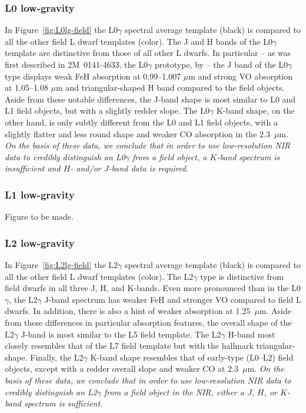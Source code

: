 \documentclass[12pt,preprint]{aastex}
\begin{document}
\subsubsection{L0 low-gravity}
In Figure~\ref{fig:L0lg-field} the L0$\gamma$ spectral average template (black) is compared to all the other field L dwarf templates (color).  The J and H bands of the L0$\gamma$ template are distinctive from those of all other L dwarfs. In particular -- as was first described in 2M~0141-4633, the L0$\gamma$ prototype, by \cite{Kirkpatrick06} -- the J band of the L0$\gamma$ type displays weak FeH absorption at 0.99--1.007 $\mu$m and strong VO absorption at 1.05--1.08 $\mu$m and triangular-shaped H band compared to the field objects. Aside from these notable differences, the J-band shape is most similar to L0 and L1 field objects, but with a slightly redder slope. The L0$\gamma$ K-band shape, on the other hand, is only subtly different from the L0 and L1 field objects, with a slightly flatter and less round shape and weaker CO absorption in the 2.3~$\mu$m. 
\emph{On the basis of these data, we conclude that in order to use low-resolution NIR data to credibly distinguish an L0$\gamma$ from a field object, a $K$-band spectrum is insufficient and $H$- and/or $J$-band data is required.}

\subsubsection{L1 low-gravity}
Figure to be made.

\subsubsection{L2 low-gravity}
In Figure~\ref{fig:L2lg-field} the L2$\gamma$ spectral average template (black) is compared to all the other field L dwarf templates (color). The L2$\gamma$ type is distinctive from field dwarfs in all three J, H, and K-bands. 
Even more pronounced than in the L0$\gamma$, the L2$\gamma$ J-band spectrum has weaker FeH and stronger VO compared to field L dwarfs. 
In addition, there is also a hint of weaker  absorption at 1.25~$\mu$m. Aside from these differences in particular absorption features, the overall shape of the L2$\gamma$ J-band is most similar to the L5 field template.
The L2$\gamma$ H-band most closely resembles that of the L7 field template but with the hallmark  triangular-shape. 
Finally, the L2$\gamma$ K-band shape resembles that of early-type (L0--L2) field objects, except with a redder overall slope and weaker CO at 2.3~$\mu$m. 
\emph{On the basis of these data, we conclude that in order to use low-resolution NIR data to credibly distinguish an L2$\gamma$ from a field object in the NIR, either a $J$, $H$, or $K$-band spectrum is sufficient.}
\end{document}
